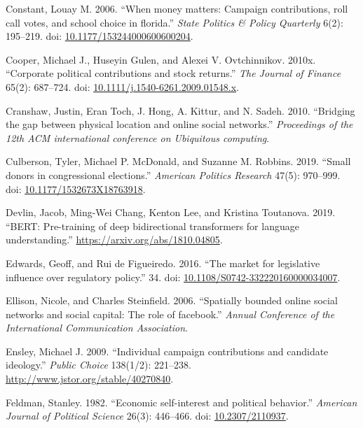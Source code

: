\documentclass[12pt,]{article}
\newlength{\cslhangindent}
\newenvironment{CSLReferences}[2]%
    {\setlength{\parindent}{0pt}%
    \everypar{\setlength{\hangindent}{\cslhangindent}}\ignorespaces}%
    {\par}
\begin{document}
\begin{CSLReferences}{1}{0}
\leavevmode{}%
Constant, Louay M. 2006. {``When money matters: Campaign contributions,
roll call votes, and school choice in florida.''} \emph{State Politics
\& Policy Quarterly} 6(2): 195--219. doi:
\href{https://doi.org/10.1177/153244000600600204}{10.1177/153244000600600204}.

\leavevmode{}%
Cooper, Michael J., Huseyin Gulen, and Alexei V. Ovtchinnikov. 2010x.
{``Corporate political contributions and stock returns.''} \emph{The
Journal of Finance} 65(2): 687--724. doi:
\href{https://doi.org/10.1111/j.1540-6261.2009.01548.x}{10.1111/j.1540-6261.2009.01548.x}.

\leavevmode{}%
Cranshaw, Justin, Eran Toch, J. Hong, A. Kittur, and N. Sadeh. 2010.
{``Bridging the gap between physical location and online social
networks.''} \emph{Proceedings of the 12th ACM international conference
on Ubiquitous computing}.

\leavevmode{}%
Culberson, Tyler, Michael P. McDonald, and Suzanne M. Robbins. 2019.
{``Small donors in congressional elections.''} \emph{American Politics
Research} 47(5): 970--999. doi:
\href{https://doi.org/10.1177/1532673X18763918}{10.1177/1532673X18763918}.

\leavevmode{}%
Devlin, Jacob, Ming-Wei Chang, Kenton Lee, and Kristina Toutanova. 2019.
{``BERT: Pre-training of deep bidirectional transformers for language
understanding.''} \url{https://arxiv.org/abs/1810.04805}.

\leavevmode{}%
Edwards, Geoff, and Rui de Figueiredo. 2016. {``The market for
legislative influence over regulatory policy.''} 34. doi:
\href{https://doi.org/10.1108/S0742-332220160000034007}{10.1108/S0742-332220160000034007}.

\leavevmode{}%
Ellison, Nicole, and Charles Steinfield. 2006. {``Spatially bounded
online social networks and social capital: The role of facebook.''}
\emph{Annual Conference of the International Communication Association}.

\leavevmode{}%
Ensley, Michael J. 2009. {``Individual campaign contributions and
candidate ideology.''} \emph{Public Choice} 138(1/2): 221--238.
\url{http://www.jstor.org/stable/40270840}.

\leavevmode{}%
Feldman, Stanley. 1982. {``Economic self-interest and political
behavior.''} \emph{American Journal of Political Science} 26(3):
446--466. doi: \href{https://doi.org/10.2307/2110937}{10.2307/2110937}.


\end{CSLReferences}
\end{document}
